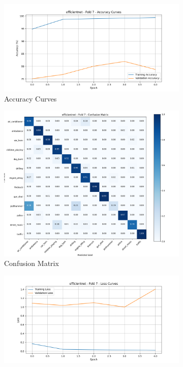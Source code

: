 \documentclass[11pt]{article}
\begin{document}
\begin{figure}[ht]
    \centering
    \begin{subfigure}[b]{0.24\textwidth}
        \centering
        \includegraphics[width=\textwidth]{latex/assets/efficientnet_pretrained_fold7/accuracy_curves.png}
        \caption{Accuracy Curves}
    \end{subfigure}
    \hfill
    \begin{subfigure}[b]{0.24\textwidth}
        \centering
        \includegraphics[width=\textwidth]{latex/assets/efficientnet_pretrained_fold7/confusion_matrix.png}
        \caption{Confusion Matrix}
    \end{subfigure}
    \hfill
    \begin{subfigure}[b]{0.24\textwidth}
        \centering
        \includegraphics[width=\textwidth]{latex/assets/efficientnet_pretrained_fold7/loss_curves.png}

\end{subfigure}
\end{figure}
\end{document}
